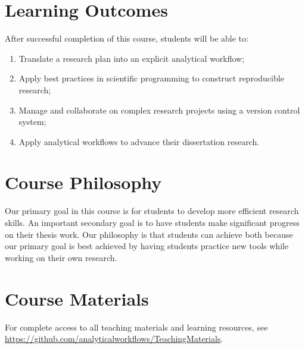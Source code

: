 \documentclass[10pt]{article}
\begin{document}
\section*{Learning Outcomes}
After successful completion of this course, students will be able to:
\begin{enumerate}
	\itemsep0em
	\item Translate a research plan into an explicit analytical workflow;
	\item Apply best practices in scientific programming to construct reproducible research;
	\item Manage and collaborate on complex research projects using a version control system;
	\item Apply analytical workflows to advance their dissertation research.
\end{enumerate}

\section*{Course Philosophy}
Our primary goal in this course is for students to develop more efficient research skills.  
An important secondary goal is to have students make significant progress on their thesis work.  
Our philosophy is that students can achieve both because our primary goal is best achieved by having 
students practice new tools while working on their own research.

\section*{Course Materials}
For complete access to all teaching materials and learning resources, see\\
\url{https://github.com/analyticalworkflows/TeachingMaterials}.
\end{document}
